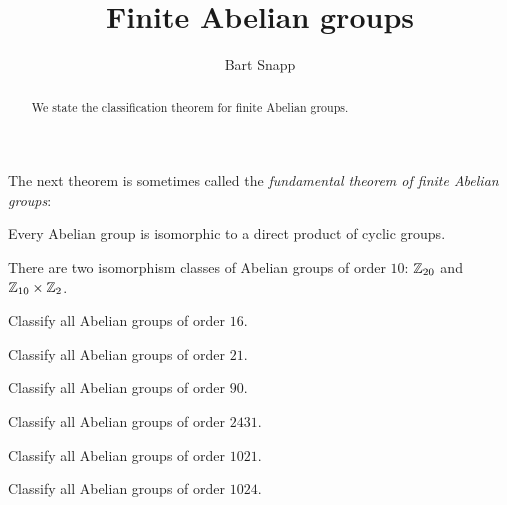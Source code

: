 \documentclass{ximera}
\author{Bart Snapp}
\title{Finite Abelian groups}
\begin{document}
\begin{abstract}
  We state the classification theorem for finite Abelian groups.
\end{abstract}
\maketitle


The next theorem is sometimes called the \textit{fundamental theorem
  of finite Abelian groups}:

\begin{theorem}
  Every Abelian group is isomorphic to a direct product of cyclic groups.
\end{theorem}



\begin{example}
  There are two isomorphism classes of Abelian groups of order $10$:
  $\mathbb Z_{20}$ and $\mathbb Z_{10}\times\mathbb Z_2$.
\end{example}



\begin{exercise}
  Classify all Abelian groups of order $16$.
\end{exercise}

\begin{exercise}
  Classify all Abelian groups of order $21$.
\end{exercise}

\begin{exercise}
  Classify all Abelian groups of order $90$.
\end{exercise}


\begin{exercise}
  Classify all Abelian groups of order $2431$.
\end{exercise}

\begin{exercise}
  Classify all Abelian groups of order $1021$.
\end{exercise}

\begin{exercise}
  Classify all Abelian groups of order $1024$.
\end{exercise}
\end{document}
